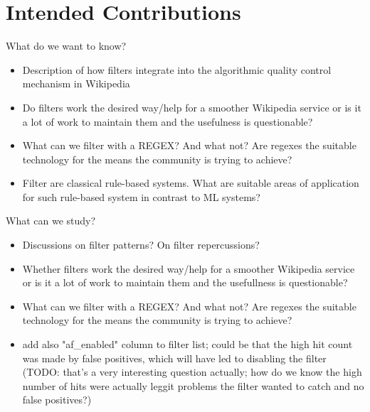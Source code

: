 \documentclass{sigchi}
\begin{document}


\section{Intended Contributions}

What do we want to know?


\begin{itemize}
    \item Description of how filters integrate into the algorithmic quality control mechanism in Wikipedia
    \item Do filters work the desired way/help for a smoother Wikipedia service or is it a lot of work to maintain them and the usefulness is questionable?
    \item What can we filter with a REGEX? And what not? Are regexes the suitable technology for the means the community is trying to achieve?
    \item Filter are classical rule-based systems. What are suitable areas of application for such rule-based system in contrast to ML systems?
\end{itemize}


What can we study?

\begin{itemize}
    \item Discussions on filter patterns? On filter repercussions?
    \item Whether filters work the desired way/help for a smoother Wikipedia service or is it a lot of work to maintain them and the usefullness is questionable?
    \item What can we filter with a REGEX? And what not? Are regexes the suitable technology for the means the community is trying to achieve?
    \item add also "af\_enabled" column to filter list; could be that the high hit count was made by false positives, which will have led to disabling the filter (TODO: that's a very interesting question actually; how do we know the high number of hits were actually leggit problems the filter wanted to catch and no false positives?)
\end{itemize}
\end{document}
